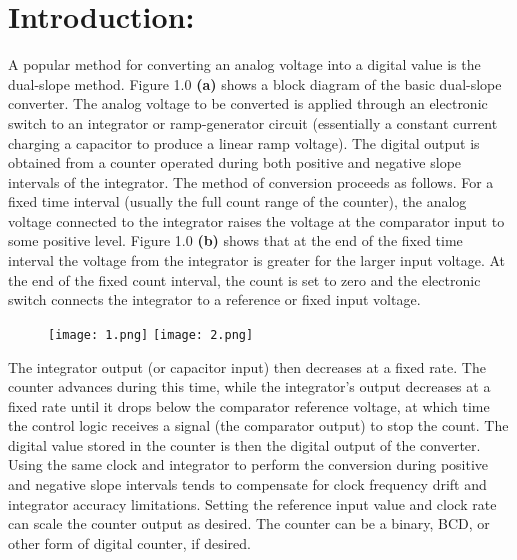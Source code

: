 \section{Introduction:}

A popular method for converting an analog voltage into a digital value is the dual-slope method. Figure 1.0 {\bfseries (a)} shows a block diagram of the basic dual-slope converter. The analog voltage to be converted is applied through an electronic switch to an integrator or ramp-generator circuit (essentially a constant current charging a capacitor to produce a linear ramp voltage). The digital output is obtained from a counter operated during both positive and negative slope intervals of the integrator. The method of conversion proceeds as follows. For a fixed time interval (usually the full count range of the counter), the analog voltage connected to the integrator raises the voltage at the comparator input to some positive level. Figure 1.0 {\bfseries (b)} shows that at the end of the fixed time interval the voltage from the integrator is greater for the larger input voltage. At the end of the fixed count interval, the count is set to zero and the electronic switch connects the integrator to a reference or fixed input voltage. \hfill \break

\begin{figure}[H]
\texttt{[image: 1.png]}
\texttt{[image: 2.png]}
\centering \linebreak {}
\end{figure} \hfill \break

The integrator output (or capacitor input) then decreases at a fixed rate. The counter advances during this time, while the integrator’s output decreases at a fixed rate until it drops below the comparator reference voltage, at which time the control logic receives a signal (the comparator output) to stop the count. The digital value stored in the counter is then the digital output of the converter. Using the same clock and integrator to perform the conversion during positive and negative slope intervals tends to compensate for clock frequency drift and integrator accuracy limitations. Setting the reference input value and clock rate can scale the counter output as desired. The counter can be a binary, BCD, or other form of digital counter, if desired. 

